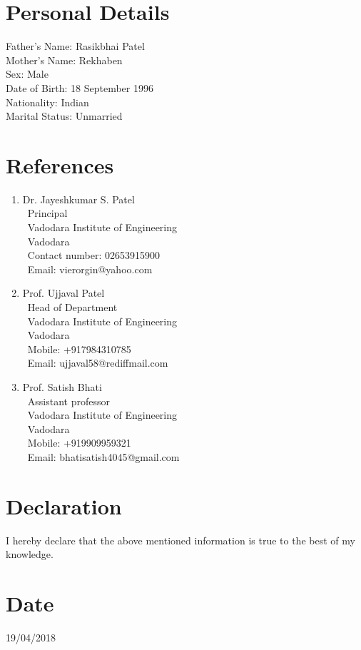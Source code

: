 \documentclass{res}
\begin{document}
\begin{resume}
\begin{itemize}
\end{itemize}

\section{ Personal Details}

 Father's Name: Rasikbhai Patel\\ [0.5ex]
 Mother's Name: Rekhaben \\ [0.5ex]
 Sex: Male\\ [0.5ex]
 Date of Birth: 18 September 1996\\ [0.5ex]
 Nationality: Indian\\ [0.5ex]
 Marital Status: Unmarried\\ [0.5ex]

\section{References}

\begin{enumerate}

\item Dr. Jayeshkumar S. Patel\\
\ Principal\\
\ Vadodara Institute of Engineering\\
\ Vadodara\\
\ Contact number: 02653915900\\
\ Email: vierorgin@yahoo.com\\

\item Prof. Ujjaval Patel\\
\ Head of Department\\
\ Vadodara Institute of Engineering\\
\ Vadodara\\
\ Mobile: +917984310785\\
\ Email: ujjaval58@rediffmail.com\\


\item Prof. Satish Bhati\\
\ Assistant professor\\
\ Vadodara Institute of Engineering\\
\ Vadodara\\
\ Mobile: +919909959321\\
\ Email: bhatisatish4045@gmail.com\\

\end{enumerate}

\section{Declaration}
 I hereby declare that the above mentioned information is true to the best of my knowledge.

\section{Date}
19/04/2018 

\end{resume}
\end{document}
